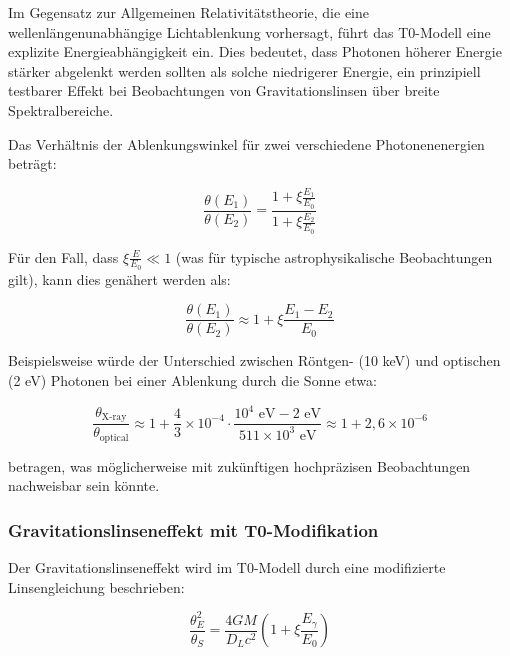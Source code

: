 \documentclass[12pt,a4paper]{article}
\theoremstyle{definition}
\begin{document}
\begin{wichtig}
Im Gegensatz zur Allgemeinen Relativitätstheorie, die eine wellenlängenunabhängige Lichtablenkung vorhersagt, führt das T0-Modell eine explizite Energieabhängigkeit ein. Dies bedeutet, dass Photonen höherer Energie stärker abgelenkt werden sollten als solche niedrigerer Energie, ein prinzipiell testbarer Effekt bei Beobachtungen von Gravitationslinsen über breite Spektralbereiche.
\end{wichtig}

\begin{verhaltnis}
Das Verhältnis der Ablenkungswinkel für zwei verschiedene Photonenenergien beträgt:

\begin{equation}
	\frac{\theta(E_1)}{\theta(E_2)} = \frac{1 + \xi \frac{E_1}{E_0}}{1 + \xi \frac{E_2}{E_0}}
\end{equation}

Für den Fall, dass $\xi \frac{E}{E_0} \ll 1$ (was für typische astrophysikalische Beobachtungen gilt), kann dies genähert werden als:

\begin{equation}
	\frac{\theta(E_1)}{\theta(E_2)} \approx 1 + \xi \frac{E_1 - E_2}{E_0}
\end{equation}

Beispielsweise würde der Unterschied zwischen Röntgen- (10 keV) und optischen (2 eV) Photonen bei einer Ablenkung durch die Sonne etwa:

\begin{equation}
	\frac{\theta_{\text{X-ray}}}{\theta_{\text{optical}}} \approx 1 + \frac{4}{3} \times 10^{-4} \cdot \frac{10^4 \text{ eV} - 2 \text{ eV}}{511 \times 10^3 \text{ eV}} \approx 1 + 2,6 \times 10^{-6}
\end{equation}

betragen, was möglicherweise mit zukünftigen hochpräzisen Beobachtungen nachweisbar sein könnte.
\end{verhaltnis}

\subsubsection{Gravitationslinseneffekt mit T0-Modifikation}

Der Gravitationslinseneffekt wird im T0-Modell durch eine modifizierte Linsengleichung beschrieben:

\begin{equation}
\frac{\theta_E^2}{\theta_S} = \frac{4GM}{D_L c^2}\left(1 + \xi \frac{E_\gamma}{E_0}\right)
\end{equation}
\end{document}
